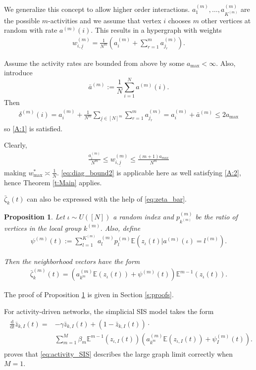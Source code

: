\documentclass{article}
\newcommand{\ul}{\underline}
\newcommand{\E}{\mathbb{E}}
\renewcommand{\d}{\mathrm{d}}
\newcommand{\1}[1]{{\mathds{1}}_{\left\{#1\right\}}}
\newtheorem{prop}{Proposition}
\newcommand{\remm}[1]{{#1}}
\begin{document}
	We generalize this concept to allow higher order interactions. $a_{1}^{(m)}, \dots, a_{K^{(m)}}^{(m)}$ are the possible $m$-activities and we assume that vertex $i$ chooses $m$ other vertices at random with rate $a^{(m)}(i).$ This results in a hypergraph with weights
	\begin{align*}
		w_{i,\underline{j}}^{(m)}= \frac{1}{N^m}\left(a_{i}^{(m)}+\sum_{r=1}^{m}a_{j_r}^{(m)} \right).
	\end{align*}
	
	Assume the activity rates are bounded from above by some $a_{\max}<\infty.$ Also, introduce
	$$\bar{a}^{(m)}:=\frac{1}{N}\sum_{i=1}^{N}a^{(m)}(i). $$
	Then
	\begin{align*}
		\delta^{(m)}(i)= a_{i}^{(m)} +\frac{1}{N^m}\sum_{\underline{j} \in [N]^m} \sum_{r=1}^{m}a_{j_r}^{(m)} =a_{i}^{(m)}+\bar{a}^{(m)} \leq 2a_{\max}
	\end{align*}
	so \eqref{A:1} is satisfied.
	
	\remm{Clearly,
	\begin{align*}
	\frac{a_{i}^{(m)}}{N^{m}} \leq w_{i, \ul{j}}^{(m)} \leq \frac{(m+1)a_{max}}{N^{m}}
	\end{align*}
	}
	\remm{ making $w_{\max}^{*} \asymp \frac{1}{N}$.}  \eqref{eq:diag_bound2} is applicable here as well satisfying \eqref{A:2}, hence Theorem \ref{t:Main} applies.
	
	$\bar{\zeta}_k(t)$ can also be expressed with the help of \eqref{eq:zeta_bar}.
	\begin{prop}
		\label{p:activity}
		Let $\iota \sim U([N])$ a random index and $p^{(m)}_{k^{(m)}}$ be the ratio of vertices in the local group $k^{(m)}.$ Also, define
		\begin{align*}
			\psi^{(m)}(t):= \sum_{l=1}^{K^{(m)}}a_{l}^{(m)}p_{l}^{(m)}\E \left(\left. z_{\iota}(t) \right| a^{(m)}(\iota)=l^{(m)} \right).
		\end{align*}
		
		Then the neighborhood vectors have the form
		\begin{align*}	
			\bar{\zeta}^{(m)}_k(t)=\left(a_{k^m}^{(m)}\E \left(z_{\iota}(t)\right)+\psi^{(m)}(t) \right)\E^{m-1} \left(z_{\iota}(t)\right).
		\end{align*}	
	\end{prop}
	
	The proof of Proposition \ref{p:activity} is given in Section \ref{s:proofs}.
	
	For activity-driven networks, the simplicial SIS model takes the form
	\begin{align}
		\begin{split}
			\label{eq:activity_SIS}
			\frac{\d}{\d t} \bar{z}_{k,I}(t)=&-\gamma\bar{z}_{k,I}(t)+
			\left(1-\bar{z}_{k,I}(t) \right) \cdot \\
			&\sum_{m=1}^{M} \beta_{m}\E^{m-1} \left(z_{\iota,I}(t)\right)\left(a_{k^m}^{(m)}\E \left(z_{\iota,I}(t)\right)+\psi_I^{(m)}(t) \right).
		\end{split}
	\end{align}
	\cite{activity2} proves that \eqref{eq:activity_SIS} describes the large graph limit correctly when $M=1$.
	
\end{document}
